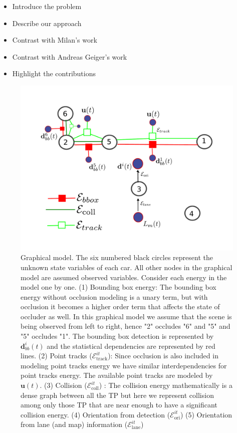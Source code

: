 \documentclass[10pt,twocolumn,letterpaper]{article}
\newcommand{\Energy}[1]{\mathcal{E}^{it}_{\text{#1}}}
\begin{document}
\begin{itemize}
  \item Introduce the problem
  \item Describe our approach
  \item Contrast with Milan's work
  \item Contrast with Andreas Geiger's work
  \item Highlight the contributions
\end{itemize}
\vspace{10cm}
\begin{figure}[t]
  \includegraphics[width=\columnwidth]{graphics/graphicalModelFrom61ConstVars.pdf}
  \caption{Graphical model. The six numbered black circles represent the
    unknown state variables of each car. All other nodes in the graphical model
    are assumed
    observed variables. Consider each energy in the model one by one. (1)
    Bounding box energy: The bounding box energy without occlusion modeling is
    a unary term, but with occlusion it becomes a higher order term that
    affects the state of occluder as well. In this graphical model we assume
    that the scene is being observed from left to right, hence "2" occludes "6"
    and "5" and "5" occludes "1". The bounding box detection is represented by
  $\mathbf{d}_{bb}^i(t)$ and the statistical dependencies are represented by
  red lines. (2) Point tracks ($\Energy{track}$): Since occlusion is also
  included in modeling point tracks energy we have similar interdependencies
  for point tracks energy. The available point tracks are modeled by
  $\mathbf{u}(t)$. (3) Collision ($\Energy{coll}$) : The collision energy
  mathematically is a dense graph between all the TP but here we represent
  collision among only those TP that are near enough to have a significant
collision energy. (4) Orientation from detection ($\Energy{ori}$) (5) Orientation from lane (and map) information ($\Energy{lane}$)}
  \label{fig:graphmodel}
\end{figure}
\end{document}
